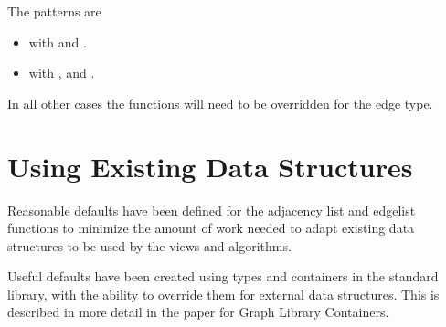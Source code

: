 The  patterns are
\begin{itemize}
    \item {} with  and .
    \item {} with ,  and .
\end{itemize}

In all other cases the functions will need to be overridden for the edge type.

\section{Using Existing Data Structures}
Reasonable defaults have been defined for the adjacency list and edgelist functions to minimize the amount of work
needed to adapt existing data structures to be used by the views and algorithms.

Useful defaults have been created using types and containers in the standard library, with the ability
to override them for external data structures. This is described in more detail in the paper for Graph Library 
Containers.
